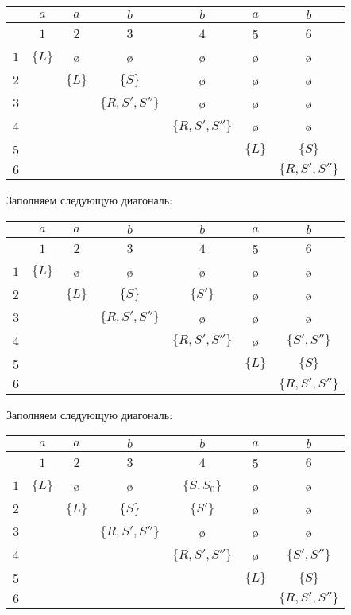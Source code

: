 \begin{example}
\begin{center}
  \begin{tabular}{c||cc|cc|cc}
    & $a$ & $a$ & $b$ & $b$ & $a$ & $b$ \\ \hline
    & $1$ & $2$ & $3$ & $4$ & 5 & $6$ \\ \hline \hline
  $1$ & $\{L\}$ & \o & \o & \o & \o & \o \\ 
  $2$ &   & $\{L\}$ & $\{S\}$ & \o & \o & \o \\ \hline
  $3$ &   &   & $\{R, S', S''\}$ & \o & \o & \o \\ 
  $4$ &   &   &   & $\{R, S', S''\}$ & \o & \o \\ \hline
  5 &   &   &   &   & $\{L\}$ & $\{S\}$ \\ 
  $6$ &   &   &   &   &   & $\{R, S', S''\}$
  \end{tabular}
\end{center}

Заполняем следующую диагональ:

\begin{center}
  \begin{tabular}{c||cc|cc|cc}
    & $a$ & $a$ & $b$ & $b$ & $a$ & $b$ \\ \hline
    & $1$ & $2$ & $3$ & $4$ & 5 & $6$ \\ \hline \hline
  $1$ & $\{L\}$ & \o & \o & \o & \o & \o \\ 
  $2$ &   & $\{L\}$ & $\{S\}$ & $\{S'\}$ & \o & \o \\ \hline
  $3$ &   &   & $\{R, S', S''\}$ & \o & \o & \o \\ 
  $4$ &   &   &   & $\{R, S', S''\}$ & \o & $\{S', S''\}$ \\ \hline
  5 &   &   &   &   & $\{L\}$ & $\{S\}$ \\ 
  $6$ &   &   &   &   &   & $\{R, S', S''\}$
  \end{tabular}
\end{center}

Заполняем следующую диагональ:

\begin{center}
  \begin{tabular}{c||cc|cc|cc}
    & $a$ & $a$ & $b$ & $b$ & $a$ & $b$ \\ \hline
    & $1$ & $2$ & $3$ & $4$ & 5 & $6$ \\ \hline \hline
  $1$ & $\{L\}$ & \o & \o & $\{S, S_0\}$ & \o & \o \\ 
  $2$ &   & $\{L\}$ & $\{S\}$ & $\{S'\}$ & \o & \o \\ \hline
  $3$ &   &   & $\{R, S', S''\}$ & \o & \o & \o \\ 
  $4$ &   &   &   & $\{R, S', S''\}$ & \o & $\{S', S''\}$ \\ \hline
  5 &   &   &   &   & $\{L\}$ & $\{S\}$ \\ 
  $6$ &   &   &   &   &   & $\{R, S', S''\}$
  \end{tabular}
\end{center}


\end{example}
